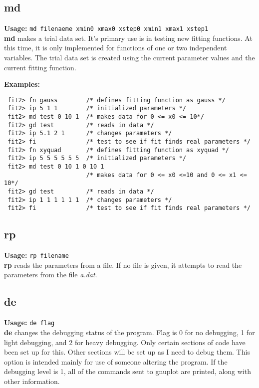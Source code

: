 \subsection{md}      {\bf Usage: } {\tt  md filenaeme xmin0 xmax0 xstep0 xmin1 xmax1 xstep1} \\

        {\bf md} makes a trial data set.  It's primary use is in
 testing new fitting functions.  At this time, it is only 
 implemented for functions of one or two independent 
 variables.  The trial data set is created using the current
 parameter values and the current fitting function.

 {\bf Examples:}

\begin{verbatim}
 fit2> fn gauss        /* defines fitting function as gauss */
 fit2> ip 5 1 1        /* initialized parameters */
 fit2> md test 0 10 1  /* makes data for 0 <= x0 <= 10*/
 fit2> gd test         /* reads in data */
 fit2> ip 5.1 2 1      /* changes parameters */
 fit2> fi              /* test to see if fit finds real parameters */
 fit2> fn xyquad       /* defines fitting function as xyquad */
 fit2> ip 5 5 5 5 5 5  /* initialized parameters */
 fit2> md test 0 10 1 0 10 1
                       /* makes data for 0 <= x0 <=10 and 0 <= x1 <= 10*/
 fit2> gd test         /* reads in data */
 fit2> ip 1 1 1 1 1 1  /* changes parameters */
 fit2> fi              /* test to see if fit finds real parameters */
\end{verbatim}

\subsection{rp}     {\bf Usage: } {\tt  rp filename} \\

        {\bf rp} reads the parameters from a file.  If no file is
 given, it attempts to read the parameters from the file 
 {\em a.dat}.

\subsection{de}      {\bf Usage: } {\tt  de flag} \\

		{\bf de} changes the debugging status of the program.
 Flag is 0 for no debugging, 1 for light debugging, and 2
 for heavy debugging. Only certain sections of code have
 been set up for this.  Other sections will be set up as I 
 need to debug them.  This option is intended mainly for 
 use of someone altering the program. If the debugging level
 is 1, all of the commands sent to gnuplot are printed, 
 along with other information.

